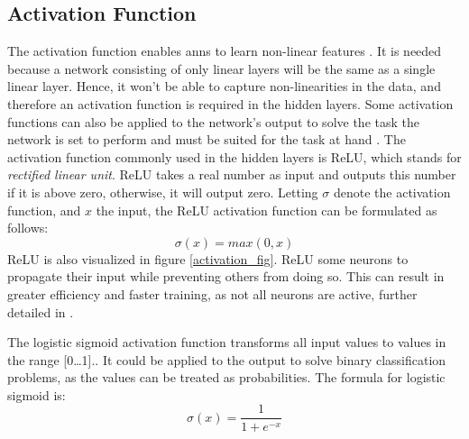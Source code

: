         
    \subsection{Activation Function} \label{activation function}
        The activation function enables \gls{ann}s to learn non-linear features \cite{razavi2021deep_exp_per}. It is needed because a network consisting of only linear layers will be the same as a single linear layer\cite{razavi2021deep_exp_per}. Hence, it won't be able to capture non-linearities in the data, and therefore an activation function is required in the hidden layers. Some activation functions can also be applied to the network's output to solve the task the network is set to perform and must be suited for the task at hand \cite{Goodfellow-et-al-2016}. The activation function commonly used in the hidden layers is ReLU, which stands for \textit{rectified linear unit}\cite{sharma2019new_activation_func}. ReLU takes a real number as input and outputs this number if it is above zero,  otherwise, it will output zero. Letting $\sigma$ denote the activation function, and $x$ the input, the ReLU activation function can be formulated as follows:
            \begin{equation} \label{relu_eq}
                \sigma(x) = max(0,x)
            \end{equation}
        ReLU is also visualized in figure \ref{activation_fig}. ReLU some neurons to propagate their input while preventing others from doing so. This can result in greater efficiency and faster training, as not all neurons are active, further detailed in \citeauthor{sharma2019new_activation_func}\cite{sharma2019new_activation_func}. 
        
        The logistic sigmoid activation function transforms all input values to values in the range [0…1].\cite{sharma2019new_activation_func}. It could be applied to the output to solve binary classification problems, as the values can be treated as probabilities. The formula for logistic sigmoid is:
            \begin{equation} \label{sigmoid_eq}
                \sigma(x) = \dfrac{1}{1 + e^{-x}} 
            \end{equation}
            
